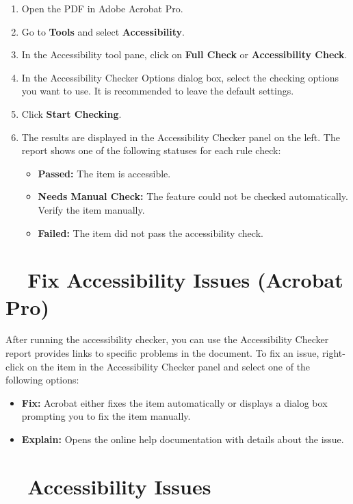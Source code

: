 \begin{enumerate}
	\item Open the PDF in Adobe Acrobat Pro.
	\item Go to \textbf{Tools} and select \textbf{Accessibility}.
	\item In the Accessibility tool pane, click on \textbf{Full Check} or \textbf{Accessibility Check}.
	\item In the Accessibility Checker Options dialog box, select the checking options you want to use. It is recommended to leave the default settings.
	\item Click \textbf{Start Checking}.
	\item The results are displayed in the Accessibility Checker panel on the left. The report shows one of the following statuses for each rule check:
	      \begin{itemize}
		      \item \textbf{Passed:} The item is accessible.
		      \item \textbf{Needs Manual Check:} The feature could not be checked automatically. Verify the item manually.
		      \item \textbf{Failed:} The item did not pass the accessibility check.
	      \end{itemize}
\end{enumerate}

\section{~~Fix Accessibility Issues (Acrobat Pro)}
\label{sec:fix-accessibility-issues-acrobat-pro}

After running the accessibility checker, you can use the Accessibility Checker report provides links to specific problems in the document. To fix an issue, right-click on the item in the Accessibility Checker panel and select one of the following options:

\begin{itemize}
	\item \textbf{Fix:} Acrobat either fixes the item automatically or displays a dialog box prompting you to fix the item manually.
	\item \textbf{Explain:} Opens the online help documentation with details about the  issue.
\end{itemize}

\section{~~Accessibility Issues}
\label{sec:accessibility-issues}

